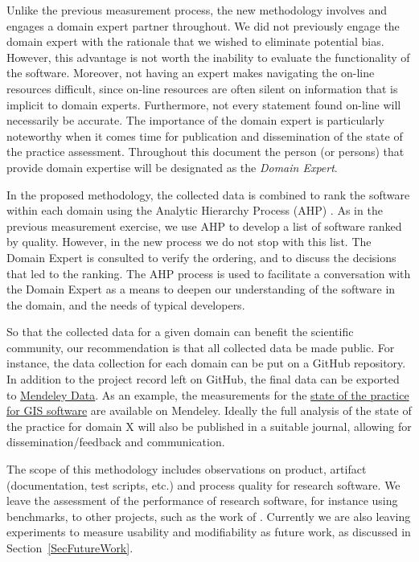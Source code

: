 \documentclass[letterpaper,cleveref]{lipics-v2019}
\begin{document}
Unlike the previous measurement process, the new methodology involves and
engages a domain expert partner throughout.  We did not previously engage the
domain expert with the rationale that we wished to eliminate potential bias.
However, this advantage is not worth the inability to evaluate the functionality
of the software.  Moreover, not having an expert makes navigating the on-line
resources difficult, since on-line resources are often silent on information
that is implicit to domain experts.  Furthermore, not every statement found
on-line will necessarily be accurate.  The importance of the domain expert is
particularly noteworthy when it comes time for publication and dissemination of
the state of the practice assessment.  Throughout this document the person (or
persons) that provide domain expertise will be designated as the \textit{Domain
Expert}.

In the proposed methodology, the collected data is combined to rank the software
within each domain using the Analytic Hierarchy Process (AHP) \citep{Saaty1980}.
As in the previous measurement exercise, we use AHP to develop a list of
software ranked by quality.  However, in the new process we do not stop with
this list.  The Domain Expert is consulted to verify the ordering, and to
discuss the decisions that led to the ranking.  The AHP process is used to
facilitate a conversation with the Domain Expert as a means to deepen our
understanding of the software in the domain, and the needs of typical
developers.

So that the collected data for a given domain can benefit the scientific
community, our recommendation is that all collected data be made public.  For
instance, the data collection for each domain can be put on a GitHub repository.
In addition to the project record left on GitHub, the final data can be exported
to \href{https://data.mendeley.com/}{Mendeley Data}.  As an example, the
measurements for the \href{https://data.mendeley.com/datasets/6kprpvv7r7/1}
{state of the practice for GIS software} are available on Mendeley.  Ideally the
full analysis of the state of the practice for domain X will also be published
in a suitable journal, allowing for dissemination/feedback and communication.

The scope of this methodology includes observations on product, artifact
(documentation, test scripts, etc.) and process quality for research software.
We leave the assessment of the performance of research software, for instance
using benchmarks, to other projects, such as the work of
\citet{kaagstrom1998gemm}.  Currently we are also leaving experiments to measure
usability and modifiability as future work, as discussed in
Section~\ref{SecFutureWork}.
\end{document}
